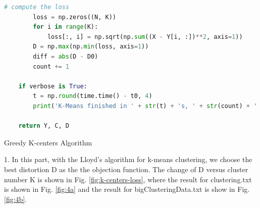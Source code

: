 \begin{description}
\begin{description}
\begin{lstlisting}[language=Python, caption={K-Means Algorithm Python Code}]
        # compute the loss
        loss = np.zeros((N, K))
        for i in range(K):
            loss[:, i] = np.sqrt(np.sum((X - Y[i, :])**2, axis=1))
        D = np.max(np.min(loss, axis=1))
        diff = abs(D - D0)
        count += 1

    if verbose is True:
        t = np.round(time.time() - t0, 4)
        print('K-Means finished in ' + str(t) + 's, ' + str(count) + ' iters')

    return Y, C, D
\end{lstlisting}

\end{description}

\newpage
\item[\Romannum{2}.] Greedy K-centers Algorithm

\begin{description}
\item{1.} In this part, with the Lloyd's algorithm for k-means clustering, we choose the best distortion D as the the objection function. The change of D versus cluster number K is shown in Fig. \ref{fig:k-centers-loss}, where the result for clustering.txt is shown in Fig. \ref{fig:4a} and the result for bigClusteringData.txt is show in Fig. \ref{fig:4b}.


\end{description}
\end{description}
